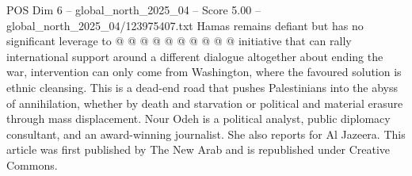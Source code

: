 \begin{textsample}{POS Dim 6 – global\_north\_2025\_04 – Score 5.00 – global\_north\_2025\_04/123975407.txt}
Hamas remains defiant but has no significant leverage to @ @ @ @ @ @ @ @ @ @ initiative that can rally international support around a different dialogue altogether about ending the war, intervention can only come from Washington, where the favoured solution is ethnic cleansing.
This is a dead-end road that pushes Palestinians into the abyss of annihilation, whether by death and starvation or political and material erasure through mass displacement.
Nour Odeh is a political analyst, public diplomacy consultant, and an award-winning journalist.
She also reports for Al Jazeera.
This article was first published by The New Arab and is republished under Creative Commons.

\end{textsample}
